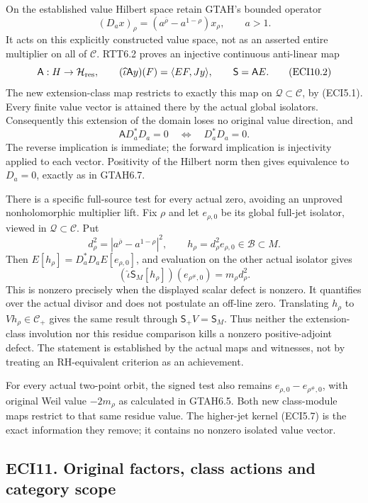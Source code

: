 On the established value Hilbert space retain GTAH's bounded operator \[
(D_ax)_\rho=(a^{\overline\rho}-a^{1-\rho})x_\rho,
\qquad a>1.
\tag{ECI10.1}
\] It acts on this explicitly constructed value space, not as an
asserted entire multiplier on all of \(\mathscr C\). RTT6.2 proves an
injective continuous anti-linear map \[
\mathsf A:H\to\mathcal H_{\rm res},\qquad
(\widehat\iota\mathsf Ay)(F)=\langle EF,Jy\rangle,
\qquad\mathsf S=\mathsf A E.
\tag{ECI10.2}
\] The new extension-class map restricts to exactly this map on
\(\mathcal Q\subset\mathscr C\), by (ECI5.1). Every finite value vector
is attained there by the actual global isolators. Consequently this
extension of the domain loses no original value direction, and \[
\mathsf A D_a^*D_a=0\quad\Longleftrightarrow\quad D_a^*D_a=0.
\tag{ECI10.3}
\] The reverse implication is immediate; the forward implication is
injectivity applied to each vector. Positivity of the Hilbert norm then
gives equivalence to \(D_a=0\), exactly as in GTAH6.7.

There is a specific full-source test for every actual zero, avoiding an
unproved nonholomorphic multiplier lift. Fix \(\rho\) and let
\(e_{\rho,0}\) be its global full-jet isolator, viewed in
\(\mathcal Q\subset\mathscr C\). Put \[
d_\rho^2=|a^{\overline\rho}-a^{1-\rho}|^2,
\qquad h_\rho=d_\rho^2 e_{\rho,0}\in\mathcal B\subset M.
\tag{ECI10.4}
\] Then \(E[h_\rho]=D_a^*D_a E[e_{\rho,0}]\), and evaluation on the
other actual isolator gives \[
(\widehat\iota\mathsf S_M[h_\rho])(e_{\rho^\#,0})
=m_\rho d_\rho^2.
\tag{ECI10.5}
\] This is nonzero precisely when the displayed scalar defect is
nonzero. It quantifies over the actual divisor and does not postulate an
off-line zero. Translating \(h_\rho\) to \(Vh_\rho\in\mathscr C_+\)
gives the same result through \(\mathsf S_+V=\mathsf S_M\). Thus neither
the extension-class involution nor this residue comparison kills a
nonzero positive-adjoint defect. The statement is established by the
actual maps and witnesses, not by treating an RH-equivalent criterion as
an achievement.

For every actual two-point orbit, the signed test also remains
\(e_{\rho,0}-e_{\rho^\#,0}\), with original Weil value \(-2m_\rho\) as
calculated in GTAH6.5. Both new class-module maps restrict to that same
residue value. The higher-jet kernel (ECI5.7) is the exact information
they remove; it contains no nonzero isolated value vector.

\subsection{ECI11. Original factors, class actions and category
scope}\label{eci11.-original-factors-class-actions-and-category-scope}

